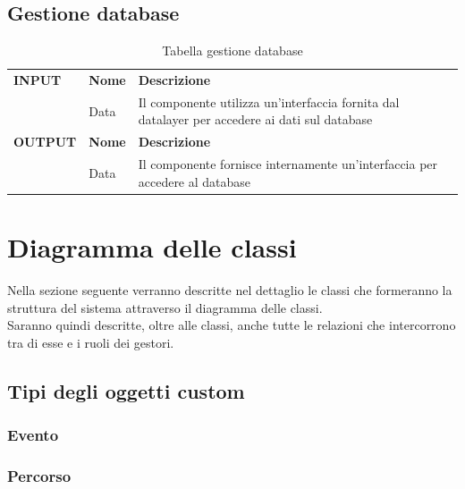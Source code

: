 \documentclass{article}
\begin{document}
\subsection{Gestione database}

\begin{table}[htbp]
    \centering
    \renewcommand{\arraystretch}{1.5} %
    \begin{tabularx}{\textwidth}{| l | l | X |}
        \Xhline{2pt}
        \textbf{INPUT} & \textbf{Nome} & \textbf{Descrizione} \\
        \Xhline{2pt}
         & Data & Il componente utilizza un’interfaccia fornita dal datalayer per accedere ai dati sul database \\
        \Xhline{2pt}
        \textbf{OUTPUT} & \textbf{Nome} & \textbf{Descrizione} \\
        \Xhline{2pt}
         & Data & Il componente fornisce internamente un’interfaccia per accedere al database \\
        \hline
    \end{tabularx}
    \caption{Tabella gestione database}
\end{table}

\clearpage

\section{Diagramma delle classi}

Nella sezione seguente verranno descritte nel dettaglio le classi che formeranno la struttura del sistema attraverso il diagramma delle classi.\\
Saranno quindi descritte, oltre alle classi, anche tutte le relazioni che intercorrono tra di esse e i ruoli dei gestori.

\subsection{Tipi degli oggetti custom}

\subsubsection{Evento}

\subsubsection{Percorso}
\end{document}
